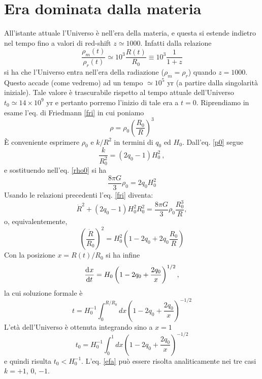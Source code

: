 \section{Era dominata dalla materia}

All'istante attuale l'Universo è nell'era della materia, e questa si estende
indietro nel tempo fino a valori di red-shift $z \simeq 1000$.  Infatti dalla
relazione
\begin{equation}
  \frac {\rho_m(t)} {\rho_r(t)} \simeq  10^{3} \frac {R(t)} {R_0} \equiv  10^3
  \frac{1}{1+z}
\end{equation}
si ha che l'Universo entra nell'era della radiazione ($\rho_m = \rho_r$) quando
$z = 1000$.  Questo accade (come vedremo) ad un tempo $ \simeq 10^5$ yr (a
partire dalla singolarità iniziale).  Tale valore è trascurabile rispetto al
tempo attuale dell'Universo $t_0 \simeq 14 \times 10^9$ yr e pertanto porremo
l'inizio di tale era a $t=0$.  Riprendiamo in esame l'eq. di Friedmann
\eqref{fri} in cui poniamo
\begin{equation}
  \rho = \rho_0 \left( \frac {R_0} {R} \right)^{3}
\end{equation}
È conveniente esprimere $\rho_0$ e $k/R^2$ in termini di $q_0$ ed $H_0$.
Dall'eq. \eqref{p0} segue
\begin{equation}
  \frac{k}{R_0^2}=(2q_0-1) H_0^2~,
\end{equation}
e sostituendo nell'eq. \eqref{rho0} si ha
\begin{equation}
  \frac{8\pi G}{3} \rho_0 = 2q_0 H_0^2
\end{equation}
Usando le relazioni precedenti l'eq. \eqref{fri} diventa:
\begin{equation}
  \dot{R}^2 + (2 q_0-1) H_0^2 R_0^2 = \frac{8\pi G}{3} \rho_0 \frac{R_0^3}{R},
\end{equation}
o, equivalentemente,
\begin{equation}
  \left(\frac{\dot R}{R_0}\right)^2 = H_0^2 \left(1-2q_0+2 q_0
    \frac{R_0}{R}\right)
\end{equation}
Con la posizione $x=R(t)/R_0$ si ha infine
\begin{equation}
  \frac{{\mathop{}\!\mathrm{d}^{}}x}{\mathop{}\!\mathrm{d} {t}^{}}= H_0 \left(1-2q_0+ \frac {2q_0}{x}\right)^{1/2},
  \label{2.40}
\end{equation}
la cui soluzione formale è
\begin{equation}
  t= H_0^{-1} \int_0^{R/R_0} dx \left(1-2q_0+\frac{2q_0}{x}\right)^{-1/2}
  \label{efa}
\end{equation}
L'età dell'Universo è ottenuta integrando sino a $x=1$
\begin{equation}
  t_0= H_0^{-1} \int_0^{1} dx \left(1-2q_0+\frac{2q_0}{x}\right)^{-1/2}
\end{equation}
e quindi risulta $t_0< H_0^{-1}$.  L'eq. \eqref{efa} può essere risolta
analiticamente nei tre casi $k=+1$, $0$, $-1$.

